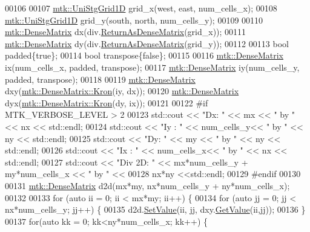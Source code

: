 \begin{DoxyCode}
00106 
00107   \hyperlink{classmtk_1_1UniStgGrid1D}{mtk::UniStgGrid1D} grid\_x(west, east, num\_cells\_x);
00108   \hyperlink{classmtk_1_1UniStgGrid1D}{mtk::UniStgGrid1D} grid\_y(south, north, num\_cells\_y);
00109 
00110   \hyperlink{classmtk_1_1DenseMatrix}{mtk::DenseMatrix} dx(div.\hyperlink{classmtk_1_1Div1D_a213fddbaaf86e4840c6a9649b69c2d49}{ReturnAsDenseMatrix}(grid\_x));
00111   \hyperlink{classmtk_1_1DenseMatrix}{mtk::DenseMatrix} dy(div.\hyperlink{classmtk_1_1Div1D_a213fddbaaf86e4840c6a9649b69c2d49}{ReturnAsDenseMatrix}(grid\_y));
00112 
00113   \textcolor{keywordtype}{bool} padded\{\textcolor{keyword}{true}\};
00114   \textcolor{keywordtype}{bool} transpose\{\textcolor{keyword}{false}\};
00115 
00116   \hyperlink{classmtk_1_1DenseMatrix}{mtk::DenseMatrix} ix(num\_cells\_x, padded, transpose);
00117   \hyperlink{classmtk_1_1DenseMatrix}{mtk::DenseMatrix} iy(num\_cells\_y, padded, transpose);
00118 
00119   \hyperlink{classmtk_1_1DenseMatrix}{mtk::DenseMatrix} dxy(\hyperlink{classmtk_1_1DenseMatrix_a01d3d8bd502870f93bf3a88a0cc5fb49}{mtk::DenseMatrix::Kron}(iy, dx));
00120   \hyperlink{classmtk_1_1DenseMatrix}{mtk::DenseMatrix} dyx(\hyperlink{classmtk_1_1DenseMatrix_a01d3d8bd502870f93bf3a88a0cc5fb49}{mtk::DenseMatrix::Kron}(dy, ix));
00121 
00122 \textcolor{preprocessor}{  #if MTK\_VERBOSE\_LEVEL > 2}
00123   std::cout << \textcolor{stringliteral}{"Dx: "} << mx << \textcolor{stringliteral}{" by "} << nx << std::endl;
00124   std::cout << \textcolor{stringliteral}{"Iy : "} << num\_cells\_y<< \textcolor{stringliteral}{" by "} << ny  << std::endl;
00125   std::cout << \textcolor{stringliteral}{"Dy: "} << my << \textcolor{stringliteral}{" by "} << ny << std::endl;
00126   std::cout << \textcolor{stringliteral}{"Ix : "} << num\_cells\_x<< \textcolor{stringliteral}{" by "} << nx  << std::endl;
00127   std::cout << \textcolor{stringliteral}{"Div 2D: "} << mx*num\_cells\_y + my*num\_cells\_x << \textcolor{stringliteral}{" by "} <<
00128     nx*ny <<std::endl;
00129 \textcolor{preprocessor}{  #endif}
00130 
00131   \hyperlink{classmtk_1_1DenseMatrix}{mtk::DenseMatrix} d2d(mx*my, nx*num\_cells\_y + ny*num\_cells\_x);
00132 
00133   \textcolor{keywordflow}{for} (\textcolor{keyword}{auto} ii = 0; ii < mx*my; ii++) \{
00134     \textcolor{keywordflow}{for} (\textcolor{keyword}{auto} jj = 0; jj < nx*num\_cells\_y; jj++) \{
00135       d2d.\hyperlink{classmtk_1_1DenseMatrix_a784ce5784109ac86bfb9d8562b334b13}{SetValue}(ii, jj, dxy.\hyperlink{classmtk_1_1DenseMatrix_a4b23ecbebd970b5eea915dbb50691024}{GetValue}(ii,jj));
00136     \}
00137     \textcolor{keywordflow}{for}(\textcolor{keyword}{auto} kk = 0; kk<ny*num\_cells\_x; kk++) \{

\end{DoxyCode}
